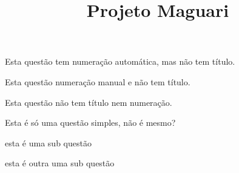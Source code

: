 \documentclass[a4paper,12pt]{article}
\title{Projeto Maguari}
\begin{document}
\maketitle

\questao
Esta questão tem numeração automática, mas não tem título.

\questao*[19]

Esta questão numeração manual e não tem título.


\questao*
Esta questão não tem título nem numeração.

\qitem Esta é só uma questão simples, não é mesmo?

\qsubitem esta é uma sub questão

\qsubitem esta é outra uma sub questão 
\end{document}
